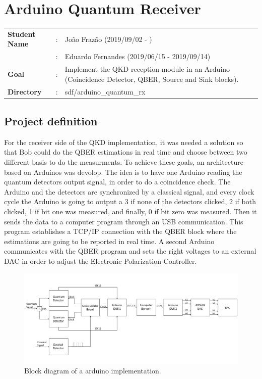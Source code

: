 \clearpage
\section{Arduino Quantum Receiver}

\begin{refsection}
	
	\begin{tcolorbox}	
		\begin{tabular}{p{2.75cm} p{0.2cm} p{10.5cm}} 	
			\textbf{Student Name}  		&:&  Jo\~ao Fraz\~ao (2019/09/02 - )\\
			&:&  Eduardo Fernandes (2019/06/15 - 2019/09/14)\\
			\textbf{Goal}          &:& Implement the QKD reception module in an Arduino (Coincidence Detector, QBER, Source and Sink blocks).\\
			\textbf{Directory}              &:& sdf/arduino\_quantum\_rx
		\end{tabular}
	\end{tcolorbox}

	\subsection{Project definition }
	
	For the receiver side of the QKD implementation, it was needed a solution so that Bob could do the QBER estimations in real time and choose between two different basis to do the measurments. To achieve these goals, an architecture  based on Arduinos was devolop. The idea is to have one Arduino reading the quantum detectors output signal, in order to do a coincidence check. The Arduino and the detectors are synchronized by a classical signal, and every clock cycle the Arduino is going to output a 3 if none of the detectors clicked, 2 if both clicked, 1 if bit one was measured, and finally, 0 if bit zero was measured. Then it sends the data to a computer program through an USB communication. This program establishes a TCP/IP connection with the QBER block where the estimations are going to be reported in real time. A second Arduino communicates with the QBER program and sets the right voltages to an external DAC in order to adjust the Electronic Polarization Controller.
	
		\begin{figure}[H] 
		\centering
		\includegraphics[width=1\linewidth]{./sdf/arduino_quantum_rx/figures/Ard2.pdf}
		\caption{Block diagram of a arduino implementation.}
		\label{fig:netxpto}
		

\end{figure}
\end{refsection}
